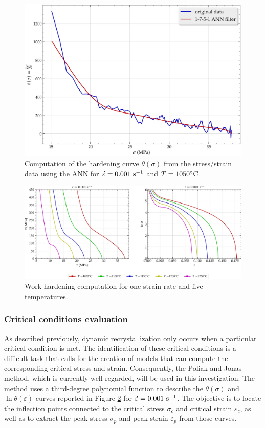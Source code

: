 \documentclass[metals,article,submit,pdftex,moreauthors]{Definitions/mdpi}
\DeclareRobustCommand{\mdot}[1]{\accentset{\mbox{\bfseries .}}{#1}}
\DeclareRobustCommand{\ps}{\text{s}^{-1}}
\begin{document}
\begin{figure}[H]
\centering
\includegraphics[width=0.7\columnwidth]{Figures/AnnTheta}
\caption{Computation of the hardening curve $\theta(\sigma)$ from the stress/strain data using the ANN for $\mdot\varepsilon=0.001~\ps$ and $T=1050\celsius$.}
\label{fig:AnnTheta}
\end{figure}

\begin{figure}[H]
\centering
\includegraphics[width=0.99\columnwidth]{Figures/nThetaOP}
\caption{Work hardening computation for one strain rate and five temperatures.}
\label{fig:nThetaOP}
\end{figure}

\subsubsection{Critical conditions evaluation\label{subsec:CrConditions}}

As described previously, dynamic recrystallization only occurs when a particular critical condition is met.
The identification of these critical conditions is a difficult task that calls for the creation of models that can compute the corresponding critical stress and strain.
Consequently, the Poliak and Jonas \cite{Poliak-1996,Poliak-2003,Poliak-2003-2,jonas2003critical} method, which is currently well-regarded, will be used in this investigation.
The method uses a third-degree polynomial function to describe the $\theta(\sigma)$ and $\ln \theta(\varepsilon)$ curves reported in Figure \ref{fig:nThetaOP} for $\mdot\varepsilon=0.001~\ps$.
The objective is to locate the inflection points connected to the critical stress $\sigma_c$ and critical strain $\varepsilon_c$, as well as to extract the peak stress $\sigma_p$ and peak strain $\varepsilon_p$ from those curves.
\end{document}
